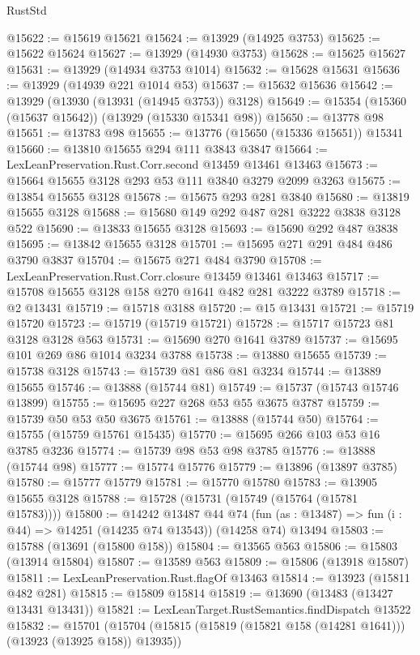 \begin{lexlean}{RustStd}
\begin{coremodule}
{\begin{coremodule}
{{{{{{{{{{{{{{{{{{{{{{{{{{{{{{{{{{{{{@15622 := @15619 @15621
@15624 := @13929 (@14925 @3753)
@15625 := @15622 @15624
@15627 := @13929 (@14930 @3753)
@15628 := @15625 @15627
@15631 := @13929 (@14934 @3753 @1014)
@15632 := @15628 @15631
@15636 := @13929 (@14939 @221 @1014 @53)
@15637 := @15632 @15636
@15642 := @13929 (@13930 (@13931 (@14945 @3753)) @3128)
@15649 := @15354 (@15360 (@15637 @15642)) (@13929 (@15330 @15341 @98))
@15650 := @13778 @98
@15651 := @13783 @98
@15655 := @13776 (@15650 (@15336 @15651)) @15341
@15660 := @13810 @15655 @294 @111 @3843 @3847
@15664 := LexLeanPreservation.Rust.Corr.second @13459 @13461 @13463
@15673 := @15664 @15655 @3128 @293 @53 @111 @3840 @3279 @2099 @3263
@15675 := @13854 @15655 @3128
@15678 := @15675 @293 @281 @3840
@15680 := @13819 @15655 @3128
@15688 := @15680 @149 @292 @487 @281 @3222 @3838 @3128 @522
@15690 := @13833 @15655 @3128
@15693 := @15690 @292 @487 @3838
@15695 := @13842 @15655 @3128
@15701 := @15695 @271 @291 @484 @486 @3790 @3837
@15704 := @15675 @271 @484 @3790
@15708 := LexLeanPreservation.Rust.Corr.closure @13459 @13461 @13463
@15717 := @15708 @15655 @3128 @158 @270 @1641 @482 @281 @3222 @3789
@15718 := @2 @13431
@15719 := @15718 @3188
@15720 := @15 @13431
@15721 := @15719 @15720
@15723 := @15719 (@15719 @15721)
@15728 := @15717 @15723 @81 @3128 @3128 @563
@15731 := @15690 @270 @1641 @3789
@15737 := @15695 @101 @269 @86 @1014 @3234 @3788
@15738 := @13880 @15655
@15739 := @15738 @3128
@15743 := @15739 @81 @86 @81 @3234
@15744 := @13889 @15655
@15746 := @13888 (@15744 @81)
@15749 := @15737 (@15743 @15746 @13899)
@15755 := @15695 @227 @268 @53 @55 @3675 @3787
@15759 := @15739 @50 @53 @50 @3675
@15761 := @13888 (@15744 @50)
@15764 := @15755 (@15759 @15761 @15435)
@15770 := @15695 @266 @103 @53 @16 @3785 @3236
@15774 := @15739 @98 @53 @98 @3785
@15776 := @13888 (@15744 @98)
@15777 := @15774 @15776
@15779 := @13896 (@13897 @3785)
@15780 := @15777 @15779
@15781 := @15770 @15780
@15783 := @13905 @15655 @3128
@15788 := @15728 (@15731 (@15749 (@15764 (@15781 @15783))))
@15800 := @14242
    @13487
    @44
    @74
    (fun (as : @13487) => fun (i : @44) => @14251 (@14235 @74 @13543))
    (@14258 @74)
    @13494
@15803 := @15788 (@13691 (@15800 @158))
@15804 := @13565 @563
@15806 := @15803 (@13914 @15804)
@15807 := @13589 @563
@15809 := @15806 (@13918 @15807)
@15811 := LexLeanPreservation.Rust.flagOf @13463
@15814 := @13923 (@15811 @482 @281)
@15815 := @15809 @15814
@15819 := @13690 (@13483 (@13427 @13431 @13431))
@15821 := LexLeanTarget.RustSemantics.findDispatch @13522
@15832 := @15701
    (@15704 (@15815 (@15819 (@15821 @158 (@14281 @1641))) (@13923 (@13925 @158)) @13935))
}}}}}}}}}}}}}}}}}}}}}}}}}}}}}}}}}}}}}
\end{coremodule}}
\end{coremodule}
\end{lexlean}
